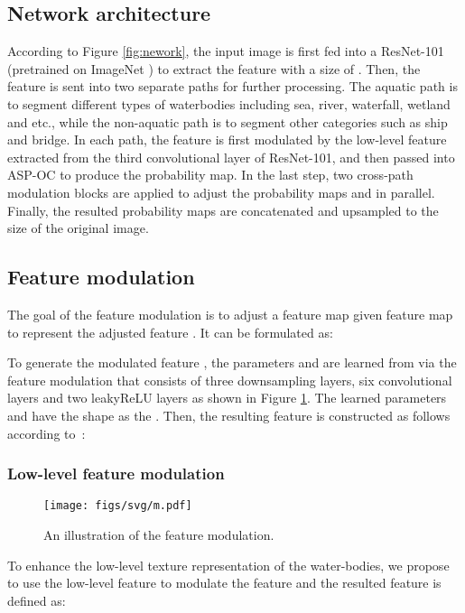 \documentclass{article}
\begin{document}
\subsection{Network architecture}
According to Figure \ref{fig:nework}, the input image is first fed into a ResNet-101 (pretrained on ImageNet \cite{deng2009imagenet}) to extract the feature  with a size of .
Then, the feature is sent into two separate paths for further processing. 
The aquatic path is to segment different types of waterbodies including sea, river, waterfall, wetland and etc., while the non-aquatic path is to segment other categories such as ship and bridge. 
In each path, the feature  is first modulated by the low-level feature  extracted from the third convolutional layer of ResNet-101, and then passed into ASP-OC \cite{YuanW18} to produce the probability map. 
In the last step, two cross-path modulation blocks are applied to adjust the probability maps  and  in parallel. Finally, the resulted probability maps are concatenated and upsampled to the size of the original image.

\subsection{Feature modulation}
The goal of the feature modulation  is to adjust a feature map  given feature map  to represent the adjusted feature . It can be formulated as:

To generate the modulated feature , the parameters  and  are learned from  via the feature modulation that consists of three downsampling layers, six  convolutional layers and two leakyReLU layers as shown in Figure \ref{fig:modulataion}. 
The learned parameters  and  have the shape as the . Then, the resulting feature  is constructed as follows according to~\cite{wang2018recovering, park2019SPADE}:


\subsubsection{Low-level feature modulation}

\begin{figure}[htbp]
	\centering
	\texttt{[image: figs/svg/m.pdf]}
	\caption{An illustration of the feature modulation. }
	\label{fig:modulataion}
\end{figure}

To enhance the low-level texture representation of the water-bodies, we propose to use the low-level feature  to modulate the feature  and the resulted feature  is defined as:
\end{document}
